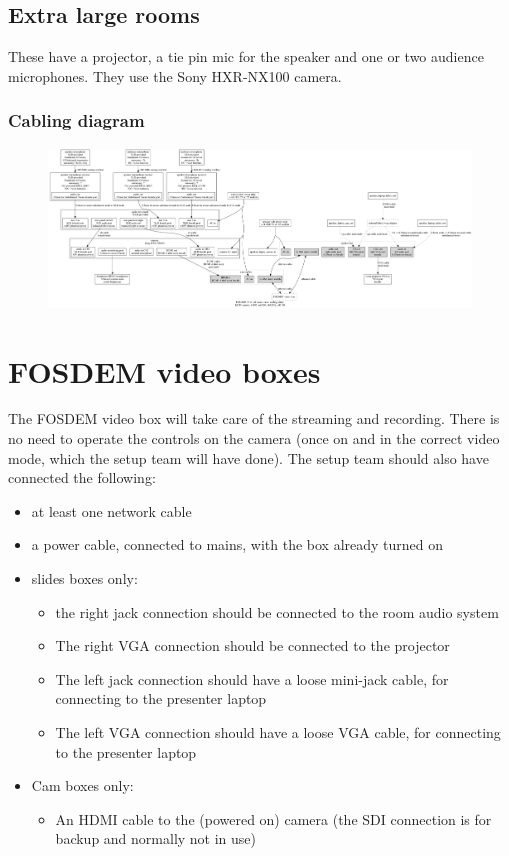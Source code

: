 \documentclass{article}
\begin{document}
\subsection{Extra large rooms}
These have a projector, a tie pin mic for the speaker and one or two audience microphones. They use the Sony HXR-NX100 camera. 
\subsubsection{Cabling diagram}
\begin{figure}[H]
  \begin{sideways}
  \centering
  \includegraphics[width = 200mm]{../../graph/cabling_xxl_rooms.png}
  \end{sideways}
\end{figure}

\section{FOSDEM video boxes}
The FOSDEM video box will take care of the streaming and recording.
There is no need to operate the controls on the camera (once on and in the correct video mode, which the setup team will have done). The setup team should also have connected the following:
\begin{itemize}
  \item at least one network cable
  \item a power cable, connected to mains, with the box already turned on
  \item slides boxes only:
    \begin{itemize}
      \item the right jack connection should be connected to the room audio system
      \item The right VGA connection should be connected to the projector
      \item The left jack connection should have a loose mini-jack cable, for connecting to the presenter laptop
      \item The left VGA connection should have a loose VGA cable, for connecting to the presenter laptop
    \end{itemize}
  \item Cam boxes only:
    \begin{itemize}
      \item An HDMI cable to the (powered on) camera (the SDI connection is for backup and normally not in use)
    \end{itemize}
\end{itemize}
\end{document}
